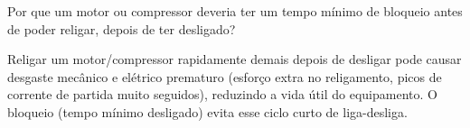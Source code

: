 \question[3] Por que um motor ou compressor deveria ter um tempo mínimo de bloqueio antes de poder religar, depois de ter desligado?

\begin{solution}
Religar um motor/compressor rapidamente demais depois de desligar pode causar desgaste mecânico e elétrico prematuro (esforço extra no religamento, picos de corrente de partida muito seguidos), reduzindo a vida útil do equipamento. O bloqueio (tempo mínimo desligado) evita esse ciclo curto de liga-desliga.
\end{solution}
